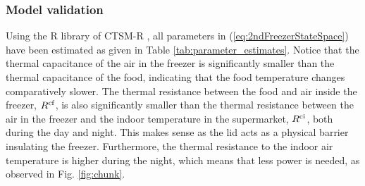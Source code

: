 \documentclass[11pt,a4paper]{article}
\begin{document}
\subsubsection{Model validation}

Using the R library of CTSM-R \cite{juhl2016ctsmr}, all parameters in (\ref{eq:2ndFreezerStateSpace}) have been estimated as given in Table \ref{tab:parameter_estimates}. Notice that the thermal capacitance of the air in the freezer is significantly smaller than the thermal capacitance of the food, indicating  that the food temperature changes comparatively slower. The thermal resistance between the food and air inside the freezer, $R^{\rm{cf}}$, is also significantly smaller than the thermal resistance between the air in the freezer and the indoor temperature in the supermarket, $R^{\rm{ci}}$, both during the day and night. This makes sense as the lid acts as a physical barrier insulating the freezer. Furthermore, the thermal resistance to the indoor air temperature is higher during the night, which means that less power is needed, as  observed in Fig. \ref{fig:chunk}.

\end{document}
